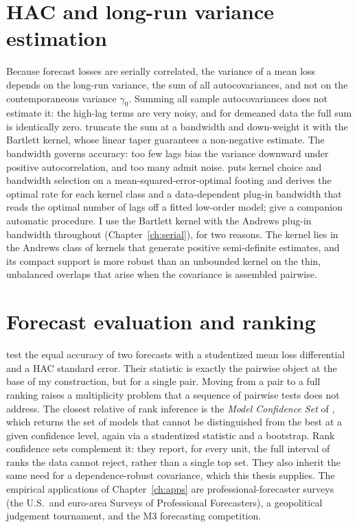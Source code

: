 \section{HAC and long-run variance estimation}
\label{sec:bg-hac}

Because forecast losses are serially correlated, the variance of a mean loss depends on
the long-run variance, the sum of all autocovariances, and not on the contemporaneous
variance $\gamma_0$. Summing all sample autocovariances does not estimate it: the
high-lag terms are very noisy, and for demeaned data the full sum is identically zero.
\citet{neweywest1987} truncate the sum at a bandwidth and down-weight it with the
Bartlett kernel, whose linear taper guarantees a non-negative estimate. The bandwidth
governs accuracy: too few lags bias the variance downward under positive
autocorrelation, and too many admit noise. \citet{andrews1991} puts kernel choice and
bandwidth selection on a mean-squared-error-optimal footing and derives the optimal rate
for each kernel class and a data-dependent plug-in bandwidth that reads the optimal
number of lags off a fitted low-order model; \citet{neweywest1994} give a companion
automatic procedure. I use the Bartlett kernel with the Andrews plug-in bandwidth
throughout (Chapter~\ref{ch:serial}), for two reasons. The kernel lies in the Andrews
class of kernels that generate positive semi-definite estimates, and its compact support
is more robust than an unbounded kernel on the thin, unbalanced overlaps that arise when
the covariance is assembled pairwise.

\section{Forecast evaluation and ranking}
\label{sec:bg-forecast}

\citet{dieboldmariano1995}
test the equal accuracy of two forecasts with a studentized mean loss differential and a
HAC standard error. Their statistic is exactly the pairwise object at the base of my
construction, but for a single pair. Moving from a pair to a full ranking raises a
multiplicity problem that a sequence of pairwise tests does not address. The closest
relative of rank inference is the \emph{Model Confidence Set} of \citet{hansen2011mcs},
which returns the set of models that cannot be distinguished from the best at a given
confidence level, again via a studentized statistic and a bootstrap. Rank confidence
sets complement it: they report, for every unit, the full interval of ranks the data
cannot reject, rather than a single top set. They also inherit the same need for a
dependence-robust covariance, which this thesis supplies. The empirical applications of
Chapter~\ref{ch:apps} are professional-forecaster surveys (the U.S.\ and euro-area
Surveys of Professional Forecasters), a geopolitical judgement tournament, and the M3
forecasting competition.
